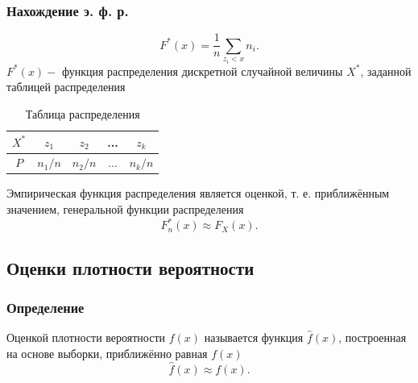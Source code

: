 \documentclass[a4paper]{article}
\begin{document}
			\subsubsection{Нахождение э. ф. р.}
			\begin{equation}
				F^*(x)=\frac{1}{n}\sum_{z_i<x}n_i.
			\end{equation}
			$F^*(x)-$ функция распределения дискретной случайной величины $X^*$, заданной таблицей распределения
			\begin{table}[H]
				\centering
				\begin{tabular}{|c|c|c|c|c|}
					\hline
					 $X^*$&$z_1$&$z_2$&...&$z_k$\\
					 \hline
					 $P$&$n_1/n$&$n_2/n$&...&$n_k/n$\\
					 \hline
				\end{tabular}
				\caption{Таблица распределения}
				\label{tab:my_label}
			\end{table}
			\noindent Эмпирическая функция распределения является оценкой, т. е. приближённым значением, генеральной функции распределения
			\begin{equation}
				F_n^*(x)\approx F_X(x).
			\end{equation}
	\subsection{Оценки плотности вероятности}
		\subsubsection{Определение}
			\noindent Оценкой плотности вероятности $f(x)$ называется функция $\widehat{f}(x)$, построенная на основе выборки, приближённо равная $f(x)$
			\begin{equation}
				\widehat{f}(x)\approx f(x).
			\end{equation}
\end{document}
